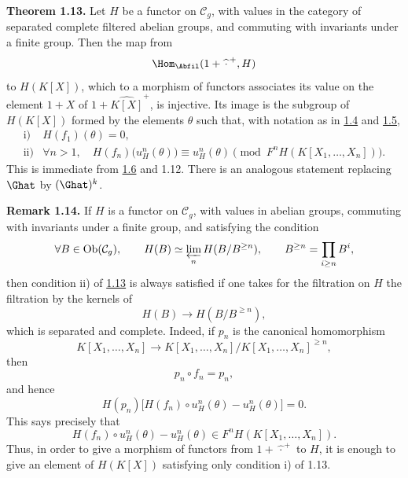 \textbf{Theorem 1.13.} Let \(H\) be a functor on \(\mathcal C_g\), with values in the category of separated complete filtered abelian groups, and commuting with invariants under a finite group. Then the map from
\[
  \Hom_{\Abfil}(1+\widehat{\,\cdot\,}^{+},H)
\]
to \(H(K[X])\), which to a morphism of functors associates its value on the element \(1+X\) of \(1+\widehat{K[X]}^{+}\), is injective. Its image is the subgroup of \(H(K[X])\) formed by the elements \(\theta\) such that, with notation as in \hyperlink{sga6.e05.para.1-4}{1.4} and \hyperlink{sga6.e05.para.1-5}{1.5},
\[
\begin{array}{ll}
\text{i)}&H(f_1)(\theta)=0,\\[0.3em]
\text{ii)}&\forall n>1,\quad
H(f_n)\bigl(u_H^n(\theta)\bigr)\equiv u_H^n(\theta)
 \pmod{F^nH(K[X_1,\ldots,X_n])}.
\end{array}
\]
This is immediate from \hyperlink{sga6.e05.thm.1-6}{1.6} and 1.12. There is an analogous statement replacing \(\Ghat\) by \((\Ghat)^k\).

\textbf{Remark 1.14.} If \(H\) is a functor on \(\mathcal C_g\), with values in abelian groups, commuting with invariants under a finite group, and satisfying the condition
\[
  \forall B\in\operatorname{Ob}(\mathcal C_g),\qquad
  H(B)\simeq \varprojlim_n H(B/B^{\geq n}),
  \qquad B^{\geq n}=\prod_{i\geq n}B^i,
\]
then condition ii) of \hyperlink{sga6.e05.thm.1-13}{1.13} is always satisfied if one takes for the filtration on \(H\) the filtration by the kernels of
\[
  H(B)\longrightarrow H(B/B^{\geq n}),
\]
which is separated and complete. Indeed, if \(p_n\) is the canonical homomorphism
\[
  K[X_1,\ldots,X_n]\longrightarrow K[X_1,\ldots,X_n]/K[X_1,\ldots,X_n]^{\geq n},
\]
then
\[
  p_n\circ f_n=p_n,
\]
and hence
\[
  H(p_n)\bigl[H(f_n)\circ u_H^n(\theta)-u_H^n(\theta)\bigr]=0.
\]
This says precisely that
\[
  H(f_n)\circ u_H^n(\theta)-u_H^n(\theta)
  \in F^nH(K[X_1,\ldots,X_n]).
\]
Thus, in order to give a morphism of functors from \(1+\widehat{\,\cdot\,}^{+}\) to \(H\), it is enough to give an element of \(H(K[X])\) satisfying only condition i) of 1.13.

